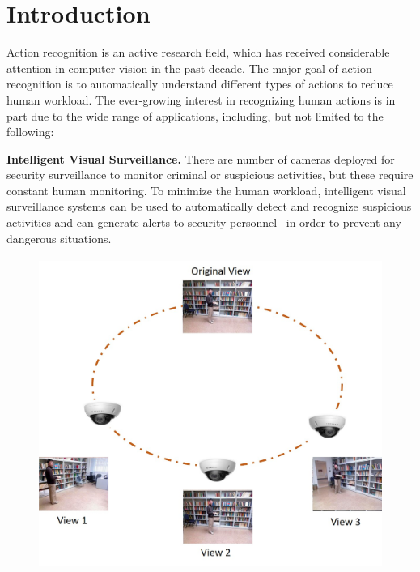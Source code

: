 \chapter{Introduction}
\label{intro}



Action recognition is an active research field, which has received considerable attention in computer vision in the past decade. The major goal of action recognition is to automatically understand different types of actions to reduce human workload. The ever-growing interest in recognizing human actions is in part due to the wide range of applications, including, but not limited to the following:

\noindent
\textbf{Intelligent Visual Surveillance.} There are number of cameras deployed for security surveillance to monitor criminal or suspicious activities, but these require constant human monitoring. To minimize the human workload, intelligent visual surveillance systems can be used to automatically detect and recognize suspicious activities and can generate alerts to security personnel~\cite{xiang2008video} in order to prevent any dangerous situations.
\begin{figure}[!ht]
\begin{center}
	\includegraphics[width=4.5in,height=4in]{figures/motivationfigure.jpg}
	\linebreak
	\label{fig1:MEHTODILL}
\end{center}
\end{figure}

